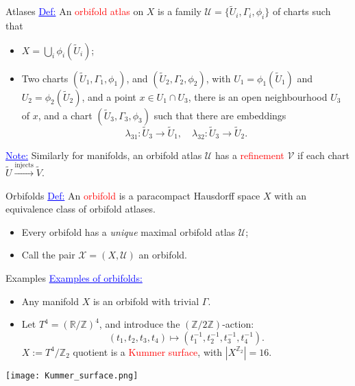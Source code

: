 \documentclass[aspectratio=169,xcolor=dvipsnames]{beamer}
\newcommand{\ra}{\rightarrow}
\newcommand{\ZZ}{\mathbb{Z}}
\newcommand{\RR}{\mathbb{R}}
\begin{document}
\begin{frame}{Atlases}
	\textcolor{blue}{\underline{Def:}} An \textcolor{red}{orbifold atlas} on $X$ is a family $\mathcal{U} = \{\widetilde{U}_{i}, \Gamma_{i}, \phi_{i}\}$ of charts such that
	\begin{itemize}
		\item $X = \bigcup_{i} \phi_{i}(\widetilde{U}_{i})$;
		\item Two charts $(\widetilde{U}_{1}, \Gamma_{1}, \phi_{1})$, and $(\widetilde{U}_{2}, \Gamma_{2}, \phi_{2})$, with $U_{1} = \phi_{1}(\widetilde{U}_{1})$ and $U_{2} = \phi_{2}(\widetilde{U}_{2})$, and a point $x \in U_{1} \cap U_{3}$, there is an open neighbourhood $U_{3}$ of $x$, and a chart $(\widetilde{U}_{3}, \Gamma_{3}, \phi_{3})$ such that there are embeddings
		\[
		\lambda_{31} : \widetilde{U}_{3} \ra \widetilde{U}_{1}, \quad \lambda_{32} : \widetilde{U}_{3} \ra \widetilde{U}_{2}.
		\]
	\end{itemize}
	\textcolor{blue}{\underline{Note:}} Similarly for manifolds, an orbifold atlas $\mathcal{U}$ has a \textcolor{red}{refinement} $\mathcal{V}$ if each chart $\widetilde{U} \overset{\text{injects}}{\longrightarrow} \widetilde{V}$.
\end{frame}

\begin{frame}{Orbifolds}
	\textcolor{blue}{\underline{Def:}} An \textcolor{red}{orbifold} is a paracompact Hausdorff space $X$ with an equivalence class of orbifold atlases.
	\begin{itemize}
		\item Every orbifold has a \emph{unique} maximal orbifold atlas $\mathcal{U}$;
		\item Call the pair $\mathcal{X} = (X, \mathcal{U})$ an orbifold.
	\end{itemize}
\end{frame}

\begin{frame}{Examples}
	\textcolor{blue}{\underline{Examples of orbifolds:}}
	\begin{itemize}
		\item Any manifold $X$ is an orbifold with trivial $\Gamma$.
		\item Let $T^{4} = (\RR/\ZZ)^{4}$, and introduce the $(\ZZ/2\ZZ)$-action:
		\[
		(t_{1}, t_{2}, t_{3}, t_{4}) \mapsto (t_{1}^{-1}, t_{2}^{-1}, t_{3}^{-1}, t_{4}^{-1}).
		\]
		$X := T^{4}/\ZZ_{2}$ quotient is a \textcolor{red}{Kummer surface}, with $|X^{\ZZ_{2}}| = 16$.
	\end{itemize}
    \texttt{[image: Kummer\_surface.png]}
\end{frame}
\end{document}
